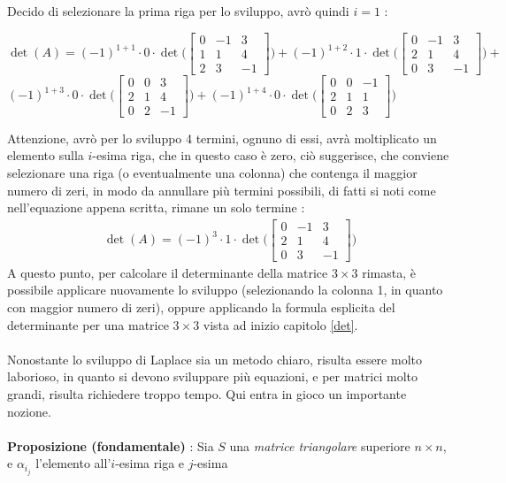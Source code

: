 \documentclass[12pt, letterpaper]{article}
\newcommand{\acc}{\\\hphantom{}\\}
\begin{document}
Decido di selezionare la prima riga per lo sviluppo, avrò quindi \(i=1\) : \begin{center}\(
    \det(A)=(-1)^{1+1}\cdot 0 \cdot \det\Big(\begin{bmatrix}0&-1&3\\1&1&4\\2&3&-1\end{bmatrix}\Big)+
    (-1)^{1+2}\cdot 1 \cdot \det\Big(\begin{bmatrix}0&-1&3\\2&1&4\\0&3&-1\end{bmatrix}\Big)+\)\\\(
    (-1)^{1+3}\cdot 0 \cdot \det\Big(\begin{bmatrix}0&0&3\\2&1&4\\0&2&-1\end{bmatrix}\Big)+
    (-1)^{1+4}\cdot 0 \cdot \det\Big(\begin{bmatrix}0&0&-1\\2&1&1\\0&2&3\end{bmatrix}\Big)\)
\end{center}
Attenzione, avrò per lo sviluppo 4 termini, ognuno di essi, avrà moltiplicato un elemento 
sulla \(i\)-esima riga, che in questo caso è zero, ciò suggerisce, che conviene selezionare 
una riga (o eventualmente una colonna) che contenga il maggior numero di zeri, in modo da 
annullare più termini possibili, di fatti si noti come nell'equazione appena scritta, rimane un solo termine :\begin{eqnarray}
    \det(A)=(-1)^{3}\cdot 1 \cdot \det\Big(\begin{bmatrix}0&-1&3\\2&1&4\\0&3&-1\end{bmatrix}\Big)
\end{eqnarray}
A questo punto, per calcolare il determinante della matrice \(3\times 3\) rimasta, è possibile applicare nuovamente lo 
sviluppo (selezionando la colonna 1, in quanto con maggior numero di zeri), oppure applicando la formula esplicita del 
determinante per una  matrice \(3\times 3\) vista ad inizio capitolo \ref{det}.\acc 
Nonostante lo sviluppo di Laplace sia un metodo chiaro, risulta essere molto laborioso, in quanto si devono sviluppare 
più equazioni, e per matrici molto grandi, risulta richiedere troppo tempo. Qui entra in gioco un importante nozione.\acc 
\textbf{Proposizione (fondamentale)} : Sia \(S\) una \textit{matrice triangolare} superiore \(n\times n\), e \(\alpha_{i_j}\) l'elemento all'\(i\)-esima riga e \(j\)-esima 
\end{document}
